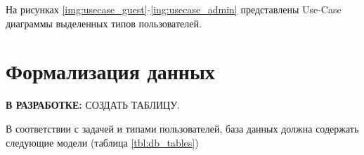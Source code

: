 На рисунках \ref{img:usecase_guest}-\ref{ing:usecase_admin} представлены Use-Case диаграммы выделенных типов пользователей.



\section{Формализация данных}

\textbf{В РАЗРАБОТКЕ:} СОЗДАТЬ ТАБЛИЦУ.

В соответствии с задачей и типами пользователей, база данных должна содержать следующие модели (таблица \ref{tbl:db_tables})





